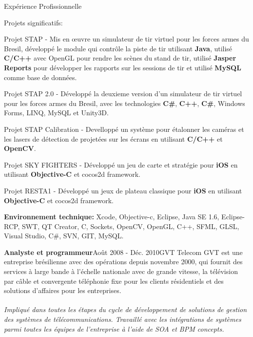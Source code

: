 \documentclass{resume}
\begin{document}
\begin{rSection}{Expérience Profissionnelle}
      \begin{rSubsection}{\fontsize{9}{10}\selectfont Projets significatifs:}{}{}{}
        \item Projet STAP - Mis en œuvre un simulateur de tir virtuel pour les forces armes du Bresil, développé le module qui contrôle la piste de tir utilisant \textbf{Java}, utilisé \textbf{C/C++} avec OpenGL pour rendre les scènes du stand de tir, utilisé \textbf{Jasper Reports} pour développer les rapports sur les sessions de tir et utilisé \textbf{MySQL} comme base de données.
        \item Projet STAP 2.0 - Développé la deuxieme version d'un simulateur de tir virtuel pour les forces armes du Bresil, avec les technologies \textbf{C#}, \textbf{C++}, \textbf{C\#}, Windows Forms, LINQ, MySQL et Unity3D.
        \item Projet STAP Calibration - Develloppé un système pour étalonner les caméras et les lasers de détection de projetées sur les écrans en utilisant \textbf{C/C++} et \textbf{OpenCV}.
        \item Projet SKY FIGHTERS - Développé un jeu de carte et stratégie pour \textbf{iOS} en utilisant \textbf{Objective-C} et cocos2d framework.
        \item Projet RESTA1 - Développé un jeux de plateau classique pour \textbf{iOS} en utilisant \textbf{Objective-C} et cocos2d framework.
      \end{rSubsection}

      {\fontsize{8}{9}\selectfont \textbf{Environnement technique:} Xcode, Objective-c, Eclipse, Java SE 1.6, Eclipse-RCP, SWT, QT Creator, C, Sockets, OpenCV, OpenGL, C++, SFML, GLSL, Visual Studio, C\#, SVN, GIT, MySQL.}\\
    

    \begin{rSubsection}{\fontsize{12}{14}\selectfont \bf Analyste et programmeur}{\fontsize{12}{14}\selectfont Août 2008 - Déc. 2010}{\fontsize{12}{14}\selectfont GVT Telecom}{}
      GVT est une entreprise brésilienne avec des opérations depuis novembre 2000, qui fournit des services à large bande à l'échelle nationale avec de grande vitesse, la télévision par câble et convergente téléphonie fixe pour les clients résidentiels et des solutions d'affaires pour les entreprises.\\\\

      \textit{Impliqué dans toutes les étapes du cycle de développement de solutions de gestion des systèmes de télécommunications. Travaillé avec les intégrations de systèmes parmi toutes les équipes de l'entreprise à l'aide de SOA et BPM concepts.}
    

\end{rSubsection}
\end{rSection}
\end{document}
